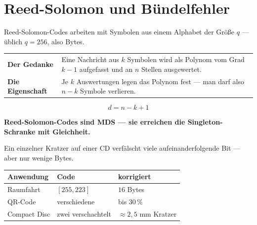 \section{Reed-Solomon und Bündelfehler}

\begin{merksatz}
Reed-Solomon-Codes arbeiten mit Symbolen aus einem Alphabet der Größe $q$ --- üblich $q=256$, also Bytes.

\begin{center}
{\small
\renewcommand{\arraystretch}{1.5}
\begin{tabular}{@{}P{2.4cm}P{6.2cm}@{}}
\toprule
\textbf{Der Gedanke} & Eine Nachricht aus $k$ Symbolen wird als Polynom vom Grad $k-1$ aufgefasst und an $n$ Stellen ausgewertet.\\
\textbf{Die Eigenschaft} & Je $k$ Auswertungen legen das Polynom fest --- man darf also $n-k$ Symbole verlieren.\\
\bottomrule
\end{tabular}}
\end{center}

\[ d = n-k+1 \]

\begin{center}
\begin{minipage}{0.9\textwidth}
\textbf{Reed-Solomon-Codes sind MDS --- sie erreichen die Singleton-Schranke mit Gleichheit.}
\end{minipage}
\end{center}

\begin{center}
\begin{minipage}{0.88\textwidth}
\end{minipage}
\end{center}

Ein einzelner Kratzer auf einer CD verfälscht viele aufeinanderfolgende Bit --- aber nur wenige Bytes.

\begin{center}
{\small
\renewcommand{\arraystretch}{1.48}
\begin{tabular}{@{}P{2.6cm}P{2.2cm}P{2.8cm}@{}}
\toprule
\textbf{Anwendung} & \textbf{Code} & \textbf{korrigiert}\\
\midrule
Raumfahrt & $[255,223]$ & $16$ Bytes\\
QR-Code & verschiedene & bis $30\,\%$\\
Compact Disc & zwei verschachtelt & $\approx2{,}5$ mm Kratzer\\
\bottomrule
\end{tabular}}
\end{center}


\end{merksatz}

